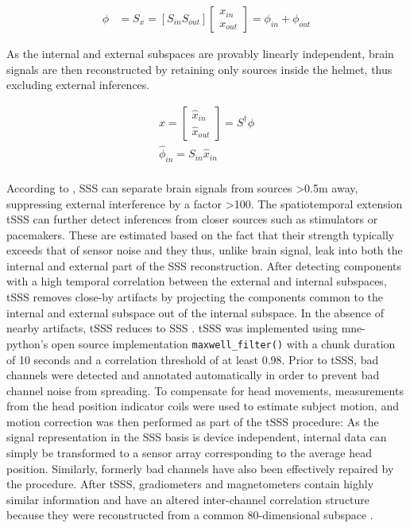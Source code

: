 \begin{equation}
	\begin{aligned}
			\phi &= S_x = [S_{in} S_{out}] \begin{bmatrix}
			x_{in} \\
			x_{out}
		\end{bmatrix} = \phi_{in} + \phi_{out}
	\end{aligned}
	\label{eq:sss}
\end{equation}

As the internal and external subspaces are provably linearly independent, brain signals are then reconstructed by retaining only sources inside the helmet, thus excluding external inferences.


\begin{equation}
	\begin{aligned}
    \hat{x} =
\begin{bmatrix}
	\hat{x}_{in} \\
	\hat{x}_{out}
\end{bmatrix}
= S^{\dagger}\phi \\
\hat{\phi}_{in} = S_{in}\hat{x}_{in}\\
	\end{aligned}
	\label{eq:sss2}
\end{equation}


According to \citet{taulu2006spatiotemporal}, \gls{SSS} can separate brain signals from sources >0.5m away, suppressing external interference by a factor >100.
The spatiotemporal extension \gls{tSSS} can further detect inferences from closer sources such as stimulators or pacemakers.
These are estimated based on the fact that their strength typically exceeds that of sensor noise and they thus, unlike brain signal, leak into both the internal and external part of the \gls{SSS} reconstruction.
After detecting components with a high temporal correlation between the external and internal subspaces, \gls{tSSS} removes close-by artifacts by projecting the components common to the internal and external subspace out of the internal subspace.
In the absence of nearby artifacts, \gls{tSSS} reduces to \gls{SSS} \citep{taulu2009removal}.
\gls{tSSS} was implemented using mne-python's open source implementation \texttt{maxwell\_filter()} with a chunk duration of 10 seconds and a correlation threshold of at least $0.98$.
Prior to \gls{tSSS}, bad channels were detected and annotated automatically in order to prevent bad channel noise from spreading.
To compensate for head movements, measurements from the head position indicator coils were used to estimate subject motion, and motion correction was then performed as part of the \gls{tSSS} procedure: As the signal representation in the \gls{SSS} basis is device independent, internal data can simply be transformed to a sensor array corresponding to the average head position.
Similarly, formerly bad channels have also been effectively repaired by the procedure.
After \gls{tSSS}, gradiometers and magnetometers contain highly similar information and have an altered inter-channel correlation structure because they were reconstructed from a common 80-dimensional subspace \citep{garces2017choice}.


